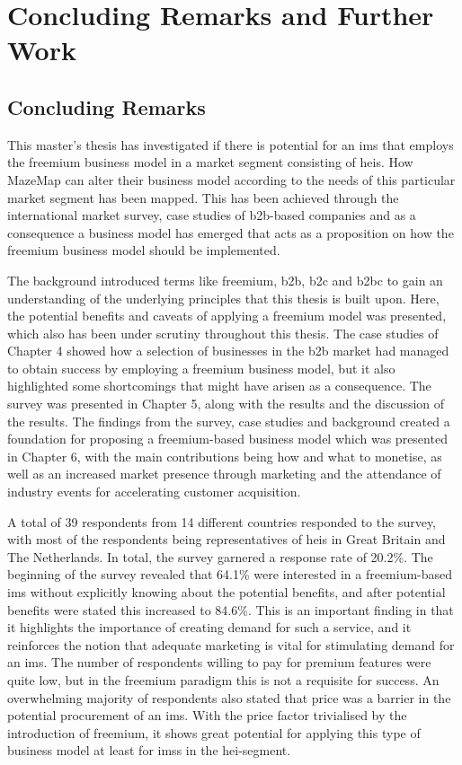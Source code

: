 \chapter{Concluding Remarks and Further Work}
\section{Concluding Remarks}
This master's thesis has investigated if there is potential for an \gls{ims} that employs the freemium business model in a market segment consisting of \glspl{hei}. How MazeMap can alter their business model according to the needs of this particular market segment has been mapped. This has been achieved through the international market survey, case studies of \gls{b2b}-based companies and as a consequence a business model has emerged that acts as a proposition on how the freemium business model should be implemented. 


The background introduced terms like freemium, \gls{b2b}, \gls{b2c} and \gls{b2bc} to gain an understanding of the underlying principles that this thesis is built upon. Here, the potential benefits and caveats of applying a freemium model was presented, which also has been under scrutiny throughout this thesis. The case studies of Chapter 4 showed how a selection of businesses in the \gls{b2b} market had managed to obtain success by employing a freemium business model, but it also highlighted some shortcomings that might have arisen as a consequence. The survey was presented in Chapter 5, along with the results and the discussion of the results. The findings from the survey, case studies and background created a foundation for proposing a freemium-based business model which was presented in Chapter 6, with the main contributions being how and what to monetise, as well as an increased market presence through marketing and the attendance of industry events for accelerating customer acquisition. 


A total of 39 respondents from 14 different countries responded to the survey, with most of the respondents being representatives of \glspl{hei} in Great Britain and The Netherlands. In total, the survey garnered a response rate of 20.2\%. The beginning of the survey revealed that 64.1\% were interested in a freemium-based \gls{ims} without explicitly knowing about the potential benefits, and after potential benefits were stated this increased to 84.6\%. This is an important finding in that it highlights the importance of creating demand for such a service, and it reinforces the notion that adequate marketing is vital for stimulating demand for an \gls{ims}. The number of respondents willing to pay for premium features were quite low, but in the freemium paradigm this is not a requisite for success. An overwhelming majority of respondents also stated that price was a barrier in the potential procurement of an \gls{ims}. With the price factor trivialised by the introduction of freemium, it shows great potential for applying this type of business model at least for \glspl{ims} in the \gls{hei}-segment.


